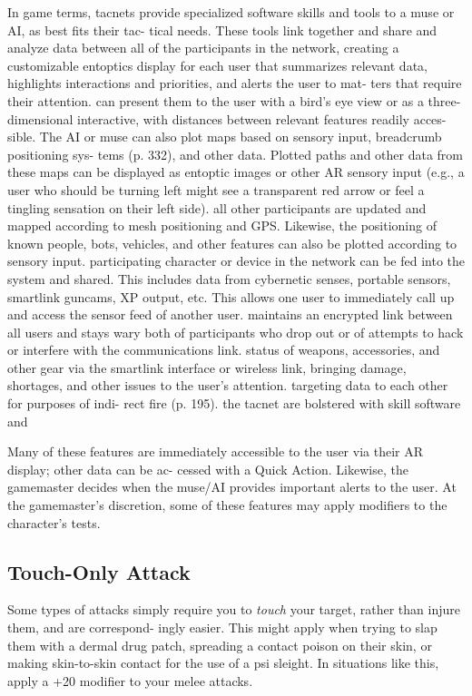 In game terms, tacnets provide specialized software 
skills and tools to a muse or AI, as best fits their tac-
tical needs. These tools link together and share and 
analyze data between all of the participants in the 
network, creating a customizable entoptics display for 
each user that summarizes relevant data, highlights 
interactions and priorities, and alerts the user to mat-
ters that require their attention.
can present them to the user with a bird's eye 
view or as a three-dimensional interactive, with 
distances between relevant features readily acces-
sible. The AI or muse can also plot maps based 
on sensory input, breadcrumb positioning sys-
tems (p. 332), and other data. Plotted paths and 
other data from these maps can be displayed as 
entoptic images or other AR sensory input (e.g., 
a user who should be turning left might see a 
transparent red arrow or feel a tingling sensation 
on their left side).
all other participants are updated and mapped 
according to mesh positioning and GPS. Likewise, 
the positioning of known people, bots, vehicles, 
and other features can also be plotted according 
to sensory input.
participating character or device in the network 
can be fed into the system and shared. This 
includes data from cybernetic senses, portable 
sensors, smartlink guncams, XP output, etc. This 
allows one user to immediately call up and access 
the sensor feed of another user.
maintains an encrypted link between all users 
and stays wary both of participants who drop 
out or of attempts to hack or interfere with the 
communications link.
status of weapons, accessories, and other gear via 
the smartlink interface or wireless link, bringing 
damage, shortages, and other issues to the user's 
attention.
targeting data to each other for purposes of indi-
rect fire (p. 195).
the tacnet are bolstered with skill software and 

Many of these features are immediately accessible 
to the user via their AR display; other data can be ac-
cessed with a Quick Action. Likewise, the gamemaster 
decides when the muse/AI provides important alerts to 
the user. At the gamemaster's discretion, some of these 
features may apply modifiers to the character's tests.

\subsection{Touch-Only Attack}

Some types of attacks simply require you to \textit{touch }your 
target, rather than injure them, and are correspond-
ingly easier. This might apply when trying to slap them 
with a dermal drug patch, spreading a contact poison 
on their skin, or making skin-to-skin contact for the 
use of a psi sleight. In situations like this, apply a +20 
modifier to your melee attacks.

